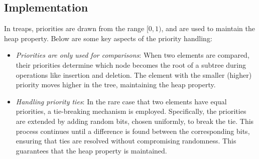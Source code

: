 \subsection{Implementation}
In treaps, priorities are drawn from the range $[0, 1)$, and are used to maintain the heap property. Below are some key aspects of the priority handling:
\begin{itemize}
    \item \textit{Priorities are only used for comparisons}: When two elements are compared, their priorities determine which node becomes the root of a subtree during operations like insertion and deletion. 
        The element with the smaller (higher) priority moves higher in the tree, maintaining the heap property.
    \item \textit{Handling priority ties}: In the rare case that two elements have equal priorities, a tie-breaking mechanism is employed. 
        Specifically, the priorities are extended by adding random bits, chosen uniformly, to break the tie. 
        This process continues until a difference is found between the corresponding bits, ensuring that ties are resolved without compromising randomness. 
        This guarantees that the heap property is maintained.
\end{itemize}